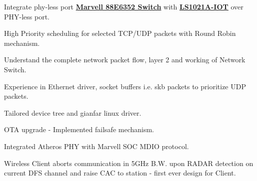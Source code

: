 %
%
%
%
\MainSubHeadingNote{\CompanyIVexp{}}
\vspace{-\topsep}\vspace{2pt}    %
\begin{itemize}\itemsep\isep
\footnotesize {
   \item \noindent Integrate phy-less port \href{https://www.marvell.com/switching/link-street/}{\textbf{Marvell 88E6352 Switch}} with \href{http://www.nxp.com/products/reference-designs/qoriq-ls1021a-iot-gateway-reference-design:LS1021A-IoT}{\textbf{\underline{LS1021A-IOT}}} over PHY-less port.
   \item \noindent High Priority scheduling for selected TCP/UDP packets with Round Robin mechanism.
   \item \noindent Understand the complete network packet flow, layer 2 and working of Network Switch.
   \item \noindent Experience in Ethernet driver, socket buffers i.e. skb packets to prioritize UDP packets.
   \item \noindent Tailored device tree and gianfar linux driver.
}
\end{itemize}\vspace{-\topsep}%
\sectionsep       %

%
%
%
%
\MainSubHeadingNote{\CompanyIIIexp{}}
\vspace{-\topsep}\vspace{2pt}    %
\begin{itemize}\itemsep\isep
\footnotesize {
   \item \noindent OTA upgrade - Implemented failsafe mechanism.
   \item \noindent Integrated Atheros PHY with Marvell SOC \textendash{} MDIO protocol.
   \item \noindent Wireless Client aborts communication in 5GHz B.W. upon RADAR detection on \\ current DFS channel and raise CAC to station - first ever design for Client.
}
\end{itemize}\vspace{-\topsep}%
\sectionsep       %


